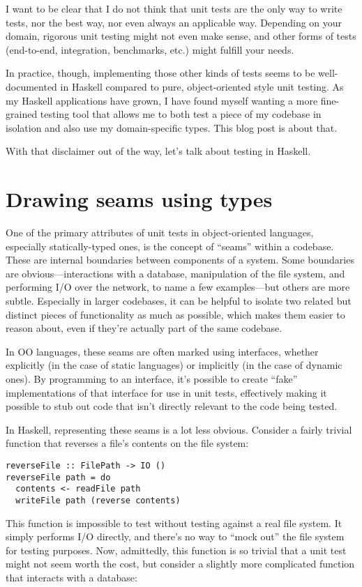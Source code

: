 I want to be clear that I do not think that unit tests are the only way
to write tests, nor the best way, nor even always an applicable way.
Depending on your domain, rigorous unit testing might not even make
sense, and other forms of tests (end-to-end, integration, benchmarks,
etc.) might fulfill your needs.

In practice, though, implementing those other kinds of tests seems to be
well-documented in Haskell compared to pure, object-oriented style unit
testing. As my Haskell applications have grown, I have found myself
wanting a more fine-grained testing tool that allows me to both test a
piece of my codebase in isolation and also use my domain-specific types.
This blog post is about that.

With that disclaimer out of the way, let's talk about testing in
Haskell.

\hypertarget{drawing-seams-using-types}{%
\section{Drawing seams using types}\label{drawing-seams-using-types}}

One of the primary attributes of unit tests in object-oriented
languages, especially statically-typed ones, is the concept of ``seams''
within a codebase. These are internal boundaries between components of a
system. Some boundaries are obvious---interactions with a database,
manipulation of the file system, and performing I/O over the network, to
name a few examples---but others are more subtle. Especially in larger
codebases, it can be helpful to isolate two related but distinct pieces
of functionality as much as possible, which makes them easier to reason
about, even if they're actually part of the same codebase.

In OO languages, these seams are often marked using interfaces, whether
explicitly (in the case of static languages) or implicitly (in the case
of dynamic ones). By programming to an interface, it's possible to
create ``fake'' implementations of that interface for use in unit tests,
effectively making it possible to stub out code that isn't directly
relevant to the code being tested.

In Haskell, representing these seams is a lot less obvious. Consider a
fairly trivial function that reverses a file's contents on the file
system:

\begin{verbatim}
reverseFile :: FilePath -> IO ()
reverseFile path = do
  contents <- readFile path
  writeFile path (reverse contents)
\end{verbatim}
This function is impossible to test without testing against a real file
system. It simply performs I/O directly, and there's no way to ``mock
out'' the file system for testing purposes. Now, admittedly, this
function is so trivial that a unit test might not seem worth the cost,
but consider a slightly more complicated function that interacts with a
database:

